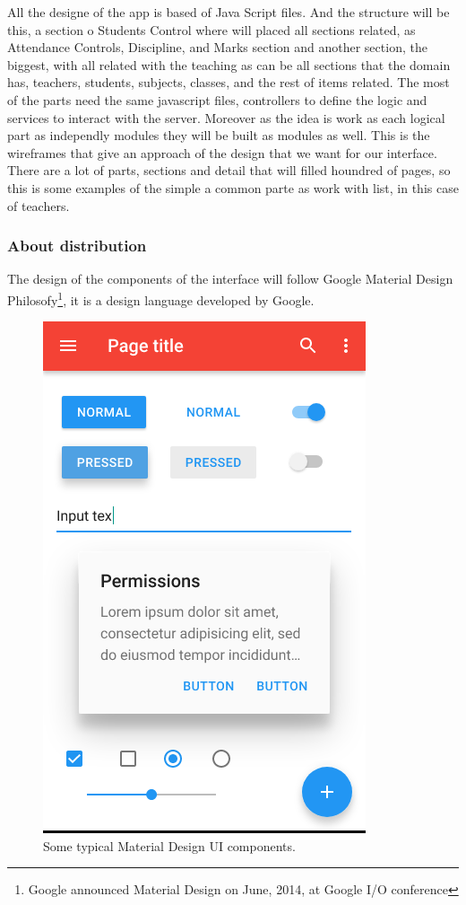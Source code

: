 All the designe of the app is based of Java Script files. And the structure will
be this,  a section o Students Control where will placed all sections related,
as Attendance Controls, Discipline, and Marks section and another section, the
biggest, with all related with the teaching as can be all sections that the domain
has, teachers, students, subjects, classes, and the rest of items related.
\intro
The most of the parts need the same javascript files, controllers to define the
logic and services to interact with the server. Moreover as the idea is work as
each logical part as independly modules they will be built as modules as well.
\intro
This is the wireframes that give an approach of the design that we want for
our interface. There are a lot of parts, sections and detail that will
filled houndred of pages, so this is some examples of the simple a common
parte as work with list, in this case of teachers.

\subsubsection{About distribution}

The design of the components of the interface will follow
Google Material Design Philosofy\footnote{Google announced Material Design on
June, 2014, at Google I/O conference}, it is a design language developed by
Google.

\begin{figure}[H]
  \includegraphics[scale=0.4]{img/graphics/MaterialDesign.png}
  \centering
  \caption{Some typical Material Design UI components.}
\end{figure}

